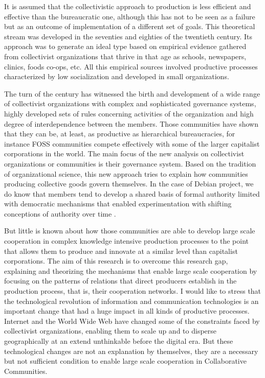 It is assumed that the collectivistic approach to production is less efficient and effective than the bureaucratic one, although this has not to be seen as a failure but as an outcome of implementation of a different set of goals. This theoretical stream was developed in the seventies and eighties of the twentieth century. Its approach was to generate an ideal type based on empirical evidence gathered from collectivist organizations that thrive in that age as schools, newspapers, clinics, foods co-ops, etc. All this empirical sources involved productive processes characterized by low socialization and developed in small organizations.

The turn of the century has witnessed the birth and development of a wide range of collectivist organizations with complex and sophisticated governance systems, highly developed sets of rules concerning activities of the organization and high degree of interdependence between the members. Those communities have shown that they can be, at least, as productive as hierarchical bureaucracies, for instance FOSS communities compete effectively with some of the larger capitalist corporations in the world. The main focus of the new analysis on collectivist organizations or communities is their governance system. Based on the tradition of organizational science, this new approach tries to explain how communities producing collective goods govern themselves. In the case of Debian project, we do know that members tend to develop a shared basis of formal authority limited with democratic mechanisms that enabled experimentation with shifting conceptions of authority over time \citep{omahony:2007}.

But little is known about how those communities are able to develop large scale cooperation in complex knowledge intensive production processes to the point that allows them to produce and innovate at a similar level than capitalist corporations. The aim of this research is to overcome this research gap, explaining and theorizing the mechanisms that enable large scale cooperation by focusing on the patterns of relations that direct producers establish in the production process, that is, their cooperation networks. I would like to stress that the technological revolution of information and communication technologies is an important change that had a huge impact in all kinds of productive processes. Internet and the World Wide Web have changed some of the constraints faced by collectivist organizations, enabling them to scale up and to disperse geographically at an extend unthinkable before the digital era. But these technological changes are not an explanation by themselves, they are a necessary but not sufficient condition to enable large scale cooperation in Collaborative Communities.

